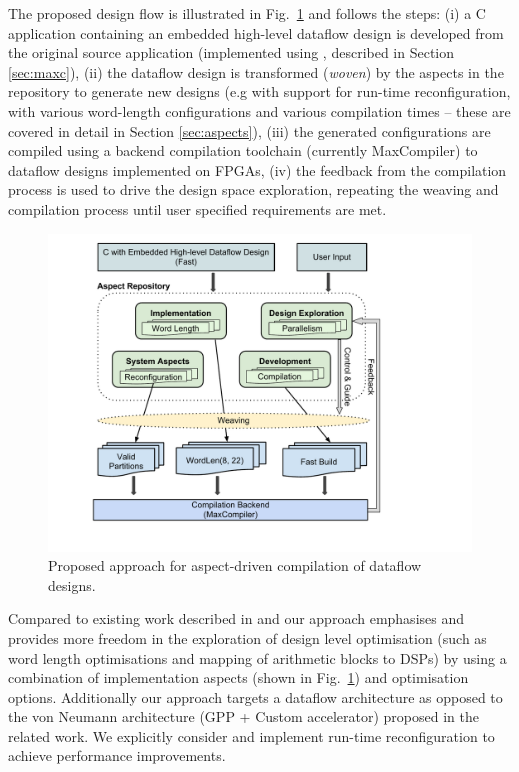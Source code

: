 The proposed design flow is illustrated in Fig.~\ref{fig:design-flow}
and follows the steps: (i) a C application containing an embedded
high-level dataflow design is developed from the original source
application (implemented using \MAXC{}, described in Section
\ref{sec:maxc}), (ii) the dataflow design is transformed
(\emph{woven}) by the aspects in the repository to generate new
designs (e.g with support for run-time reconfiguration, with various
word-length configurations and various compilation times -- these are
covered in detail in Section \ref{sec:aspects}), (iii) the generated
configurations are compiled using a backend compilation toolchain
(currently MaxCompiler) to dataflow designs implemented on FPGAs, (iv)
the feedback from the compilation process is used to drive the design
space exploration, repeating the weaving and compilation process until
user specified requirements are met.

\begin{figure}[!h]
  \includegraphics[scale=0.48, trim=60 50 0 0]{figs/design-flow}
  \caption{Proposed approach for aspect-driven compilation of dataflow
    designs.}
  \label{fig:design-flow}
\end{figure}

Compared to existing work described in
\cite{Cardoso:Teixeira:Alves:Nobre:Diniz:Cutinho:Luk:2012} and
\cite{cardoso2011new} our approach emphasises and provides more
freedom in the exploration of design level optimisation (such as word
length optimisations and mapping of arithmetic blocks to DSPs) by
using a combination of implementation aspects (shown in
Fig.~\ref{fig:design-flow}) and \MAXC{} optimisation options.
Additionally our approach targets a dataflow architecture as opposed
to the von Neumann architecture (GPP + Custom accelerator) proposed in
the related work. We explicitly consider and implement run-time
reconfiguration to achieve performance improvements.
